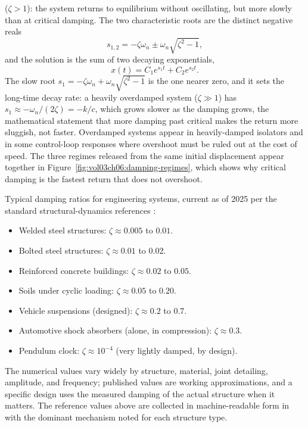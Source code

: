  ($\zeta > 1$): the system returns to equilibrium
without oscillating, but more slowly than at critical damping. The two
characteristic roots are the distinct negative reals
\[
s_{1,2} = -\zeta\omega_n \pm \omega_n\sqrt{\zeta^2 - 1},
\]
and the solution is the sum of two decaying exponentials,
\[
x(t) = C_1 e^{s_1 t} + C_2 e^{s_2 t}.
\]
The slow root $s_1 = -\zeta\omega_n + \omega_n\sqrt{\zeta^2 - 1}$ is the
one nearer zero, and it sets the long-time decay rate: a heavily
overdamped system ($\zeta \gg 1$) has $s_1 \approx -\omega_n/(2\zeta) =
-k/c$, which grows slower as the damping grows, the mathematical
statement that more damping past critical makes the return more
sluggish, not faster. Overdamped systems appear in heavily-damped
isolators and in some control-loop responses where overshoot must be
ruled out at the cost of speed. The three regimes released from the same
initial displacement appear together in
Figure~\ref{fig:vol03ch06:damping-regimes}, which shows why critical
damping is the fastest return that does not overshoot.



Typical damping ratios for engineering systems, current as of 2025
per the standard structural-dynamics references \cite{text:den-hartog-vibrations}:

\begin{itemize}[leftmargin=*]
  \item Welded steel structures: $\zeta \approx 0.005$ to $0.01$.
  \item Bolted steel structures: $\zeta \approx 0.01$ to $0.02$.
  \item Reinforced concrete buildings: $\zeta \approx 0.02$ to $0.05$.
  \item Soils under cyclic loading: $\zeta \approx 0.05$ to $0.20$.
  \item Vehicle suspensions (designed): $\zeta \approx 0.2$ to $0.7$.
  \item Automotive shock absorbers (alone, in compression): $\zeta
    \approx 0.3$.
  \item Pendulum clock: $\zeta \approx 10^{-4}$ (very lightly damped,
    by design).
\end{itemize}

The numerical values vary widely by structure, material, joint
detailing, amplitude, and frequency; published values are working
approximations, and a specific design uses the measured damping of
the actual structure when it matters. The reference values above are
collected in machine-readable form in 
with the dominant mechanism noted for each structure type.

